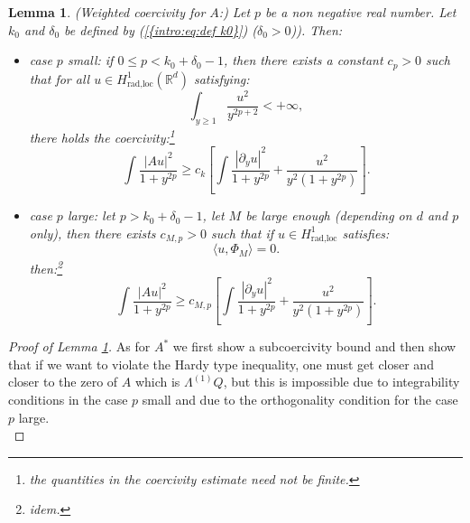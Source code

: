 \documentclass[11pt,a4paper,reqno]{amsart}
\newtheorem{lemma}[theorem]{Lemma}
\theoremstyle{remark}
\numberwithin{equation}{section}
\begin{document}
\begin{appendix}
\begin{lemma}\label{annexe:lem:coercivite A}
\emph{(Weighted coercivity for $A$:)} Let $p$ be a non negative real number. Let $k_0$ and $\delta_0$ be defined by {{\rm (\ref{{intro:eq:def k0}})}} ($\delta_0>0$)). Then:
\begin{itemize}
\item[(i)]\emph{case $p$ small:} if $0\leq p < k_0+\delta_0-1$, then there exists a constant $c_p>0$ such that for all $u\in H^1_{\text{rad},\text{loc}}(\mathbb{R}^d)$ satisfying:
\begin{equation}\label{annexe:eq:condition d'inte pour A}
\int_{y\geq 1} \frac{u^2}{y^{2p+2}}<+\infty ,
\end{equation}
there holds the coercivity:\footnote{the quantities in the coercivity estimate need not be finite.}
\begin{equation}
\int \frac{|Au|^2}{1+y^{2p}}\geq c_k \left[ \int \frac{|\partial_y u |^2}{1+y^{2p}}+\frac{u^2}{y^2(1+y^{2p})}   \right] .
\end{equation}
\item[(ii)]\emph{case $p$ large:} let $p> k_0+\delta_0-1$, let $M$ be large enough (depending on $d$ and $p$ only), then there exists $c_{M,p}>0$ such that if $u\in H^1_{\text{rad},\text{loc}}$ satisfies:
\begin{equation}
\langle u, \Phi_M \rangle=0 .
\end{equation}
then:\footnote{idem.}
\begin{equation}
\int \frac{|Au|^2}{1+y^{2p}}\geq c_{M,p} \left[ \int \frac{|\partial_y u|^2}{1+y^{2p}} +\frac{u^2}{y^2(1+y^{2p})}\right] .
\end{equation}
\end{itemize}
\end{lemma}

\begin{proof}[Proof of Lemma \ref{annexe:lem:coercivite A}] 
As for $A^*$ we first show a subcoercivity bound and then show that if we want to violate the Hardy type inequality, one must get closer and closer to the zero of $A$ which is $\Lambda^{(1)}Q$, but this is impossible due to integrability conditions in the case $p$ small and due to the orthogonality condition for the case $p$ large.\\


\end{proof}
\end{appendix}
\end{document}
